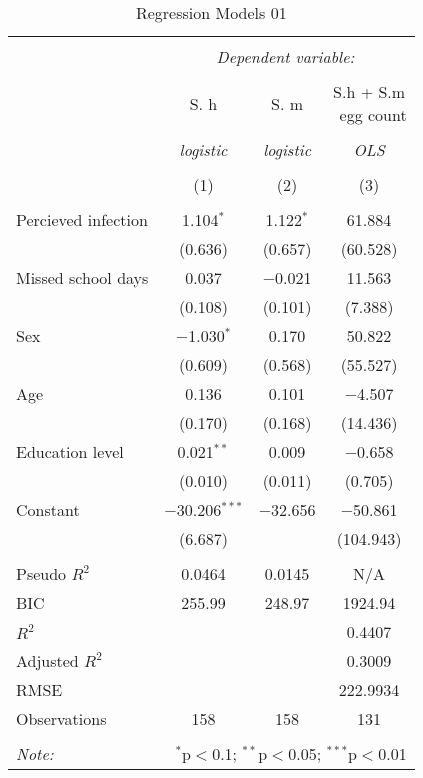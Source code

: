 
\begin{table}[!htbp] \centering 
  \caption{Regression Models 01} 
  \label{} 
\begin{tabular}{@{\extracolsep{3pt}}lccc} 
\\[-1.8ex]\hline 
\hline \\[-1.8ex] 
 & \multicolumn{3}{c}{\textit{Dependent variable:}} \\ 
\cline{2-4} 
\\[-1.8ex] & S. h & S. m & \makecell{{S.h + S.m} \\ \ {egg count}} \\ 
\\[-1.8ex] & \textit{logistic} & \textit{logistic} & \textit{OLS} \\ 
\\[-1.8ex] & (1) & (2) & (3)\\ 
\hline \\[-1.8ex] 
 Percieved infection & 1.104$^{*}$ & 1.122$^{*}$ & 61.884 \\ 
  & (0.636) & (0.657) & (60.528) \\ 
  Missed school days & 0.037 & $-$0.021 & 11.563 \\ 
  & (0.108) & (0.101) & (7.388) \\ 
  Sex & $-$1.030$^{*}$ & 0.170 & 50.822 \\ 
  & (0.609) & (0.568) & (55.527) \\ 
  Age & 0.136 & 0.101 & $-$4.507 \\ 
  & (0.170) & (0.168) & (14.436) \\ 
  Education level & 0.021$^{**}$ & 0.009 & $-$0.658 \\ 
  & (0.010) & (0.011) & (0.705) \\ 
  Constant & $-$30.206$^{***}$ & $-$32.656 & $-$50.861 \\ 
  & (6.687) &  & (104.943) \\ 
 \hline \\[-1.8ex] 
Pseudo $R^2$ & 0.0464 & 0.0145 & N/A \\ 
BIC & 255.99 & 248.97 & 1924.94 \\ 
$R^2$ &  &  & 0.4407 \\ 
Adjusted $R^2$ &  &  & 0.3009 \\ 
RMSE &  &  & 222.9934 \\ 
Observations & 158 & 158 & 131 \\ 
\hline 
\hline \\[-1.8ex] 
\textit{Note:}  & \multicolumn{3}{r}{$^{*}$p$<$0.1; $^{**}$p$<$0.05; $^{***}$p$<$0.01} \\ 
\end{tabular} 
\end{table} 
